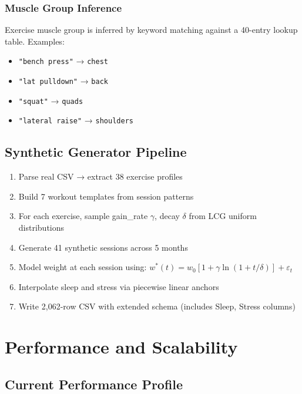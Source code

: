 \documentclass[12pt,a4paper]{report}
\begin{document}
\subsection{Muscle Group Inference}

Exercise muscle group is inferred by keyword matching against a 40-entry
lookup table. Examples:
\begin{itemize}
  \item \texttt{"bench press"} → \texttt{chest}
  \item \texttt{"lat pulldown"} → \texttt{back}
  \item \texttt{"squat"} → \texttt{quads}
  \item \texttt{"lateral raise"} → \texttt{shoulders}
\end{itemize}

\section{Synthetic Generator Pipeline}

\begin{enumerate}
  \item Parse real CSV → extract 38 exercise profiles
  \item Build 7 workout templates from session patterns
  \item For each exercise, sample gain\_rate $\gamma$, decay $\delta$
        from LCG uniform distributions
  \item Generate 41 synthetic sessions across 5 months
  \item Model weight at each session using:
        $w^*(t) = w_0[1 + \gamma\ln(1+t/\delta)] + \varepsilon_t$
  \item Interpolate sleep and stress via piecewise linear anchors
  \item Write 2{,}062-row CSV with extended schema (includes Sleep, Stress columns)
\end{enumerate}

\chapter{Performance and Scalability}

\section{Current Performance Profile}
\end{document}
